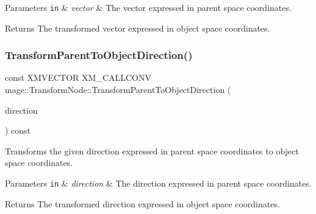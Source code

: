 \begin{DoxyParams}[1]{Parameters}
\mbox{\tt in}  & {\em vector} & The vector expressed in parent space coordinates. \\
\hline
\end{DoxyParams}
\begin{DoxyReturn}{Returns}
The transformed vector expressed in object space coordinates. 
\end{DoxyReturn}
\hypertarget{structmage_1_1_transform_node_ab7c1a1559d407f36deb342095b37e7b9}{}\label{structmage_1_1_transform_node_ab7c1a1559d407f36deb342095b37e7b9} 
\subsubsection{\texorpdfstring{Transform\+Parent\+To\+Object\+Direction()}{TransformParentToObjectDirection()}}
{\footnotesize\ttfamily const X\+M\+V\+E\+C\+T\+OR X\+M\+\_\+\+C\+A\+L\+L\+C\+O\+NV mage\+::\+Transform\+Node\+::\+Transform\+Parent\+To\+Object\+Direction (\begin{DoxyParamCaption}\item[{F\+X\+M\+V\+E\+C\+T\+OR}]{direction }\end{DoxyParamCaption}) const\hspace{0.3cm}{\ttfamily [noexcept]}}

Transforms the given direction expressed in parent space coordinates to object space coordinates.


\begin{DoxyParams}[1]{Parameters}
\mbox{\tt in}  & {\em direction} & The direction expressed in parent space coordinates. \\
\hline
\end{DoxyParams}
\begin{DoxyReturn}{Returns}
The transformed direction expressed in object space coordinates. 
\end{DoxyReturn}
\hypertarget{structmage_1_1_transform_node_afb966684b63c5e24845fa93a53802b5f}{}\label{structmage_1_1_transform_node_afb966684b63c5e24845fa93a53802b5f} 
